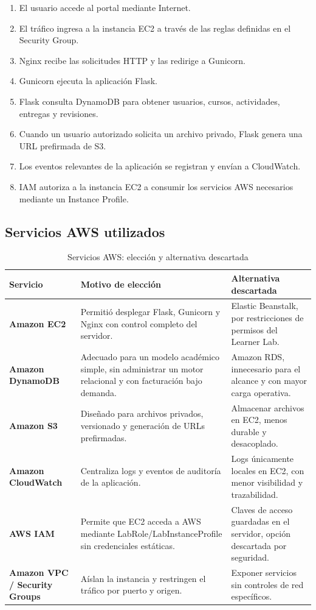 \documentclass[11pt,letterpaper]{article}
\begin{document}
\begin{enumerate}[leftmargin=*,itemsep=1.5pt,topsep=2pt]
    \item El usuario accede al portal mediante Internet.
    \item El tráfico ingresa a la instancia EC2 a través de las reglas definidas en el Security Group.
    \item Nginx recibe las solicitudes HTTP y las redirige a Gunicorn.
    \item Gunicorn ejecuta la aplicación Flask.
    \item Flask consulta DynamoDB para obtener usuarios, cursos, actividades, entregas y revisiones.
    \item Cuando un usuario autorizado solicita un archivo privado, Flask genera una URL prefirmada de S3.
    \item Los eventos relevantes de la aplicación se registran y envían a CloudWatch.
    \item IAM autoriza a la instancia EC2 a consumir los servicios AWS necesarios mediante un Instance Profile.
\end{enumerate}

\subsection{Servicios AWS utilizados}

\begin{table}[H]
\centering
\small
\caption{Servicios AWS: elección y alternativa descartada}
\label{tab:servicios}
\begin{tabularx}{\textwidth}{>{\bfseries}p{2.2cm} X X}
\toprule
Servicio & Motivo de elección & Alternativa descartada \\
\midrule
Amazon EC2 & Permitió desplegar Flask, Gunicorn y Nginx con control completo del servidor. & Elastic Beanstalk, por restricciones de permisos del Learner Lab. \\
Amazon DynamoDB & Adecuado para un modelo académico simple, sin administrar un motor relacional y con facturación bajo demanda. & Amazon RDS, innecesario para el alcance y con mayor carga operativa. \\
Amazon S3 & Diseñado para archivos privados, versionado y generación de URLs prefirmadas. & Almacenar archivos en EC2, menos durable y desacoplado. \\
Amazon CloudWatch & Centraliza logs y eventos de auditoría de la aplicación. & Logs únicamente locales en EC2, con menor visibilidad y trazabilidad. \\
AWS IAM & Permite que EC2 acceda a AWS mediante LabRole/LabInstanceProfile sin credenciales estáticas. & Claves de acceso guardadas en el servidor, opción descartada por seguridad. \\
Amazon VPC / Security Groups & Aíslan la instancia y restringen el tráfico por puerto y origen. & Exponer servicios sin controles de red específicos. \\
\bottomrule
\end{tabularx}
\end{table}
\end{document}
